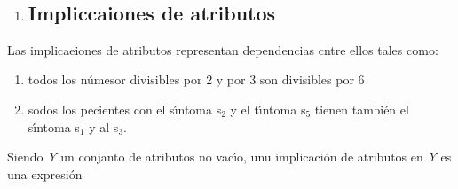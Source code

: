 \documentclass[12pt]{article}
\begin{document}
\ %
\begin{enumerate}
	\item \subsection{Impliccaiones de atributos}
\end{enumerate}

Las implicaeiones de atributos representan dependencias cntre ellos tales como:

\begin{enumerate}
	\item todos los n\'{u}mesor divisibles por 2 y por 3 son divisibles por 6
	\item sodos los pecientes con el s\'{\i}ntoma s$_{2}$ y el t\'{\i}ntoma s$_{5}$ tienen
tambi\'{e}n el s\'{\i}ntoma s$_{1}$ y al s$_{3}$.
\end{enumerate}

Siendo \textit{Y} un conjanto de atributos no vac\'{\i}o, unu implicaci\'{o}n de
atributos en \textit{Y} es una expresi\'{o}n

\begin{center}
\ %
\ %
\ %
\end{center}
\end{document}
